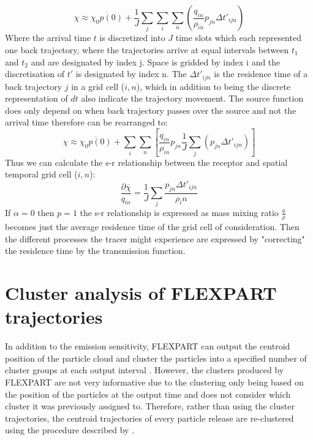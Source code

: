 \begin{equation}\label{eq:discrete_mix_ratio}
    \chi \approx \overline{\chi_0p(0)} + \frac{1}{J} \sum_j \sum_i \sum_n \left(\frac{q_{in}}{\rho_{in}}p_{jn}\Delta t'_{ijn}\right)
\end{equation}
Where the arrival time $t$ is discretized into $J$ time slots which each represented one back trajectory, where the trajectories arrive at equal intervals between $t_1$ and $t_2$ and are designated by index j. Space is gridded by index i and the discretisation of $t'$ is designated by index n. The $\Delta t'_{ijn}$ is the residence time of a back trajectory $j$ in a grid cell ($i,n$), which in addition to being the discrete representation of $dt$ also indicate the trajectory movement. The source function does only depend on when back trajectory passes over the source and not the arrival time therefore  can be rearranged to:
\begin{equation}
    \chi \approx \overline{\chi_0p(0)} + \sum_i \sum_n \left[\frac{q_{in}}{\rho_{in}}p_{jn} \frac{1}{J}\sum_j (p_{jn}\Delta t'_{ijn})\right]
\end{equation}
Thus we can calculate the s-r relationship between the receptor and spatial temporal grid cell ($i,n$):
\begin{equation}
    \frac{\partial \overline{\chi}}{q_{in}} = \frac{1}{J} \sum_j \frac{p_{jn} \Delta t'_{ijn}}{\rho_in}
\end{equation}
If $\alpha=0$ then $p=1$ the s-r relationship is expressed as mass mixing ratio $\frac{q}{\rho}$ becomes just the average residence time of the grid cell of consideration. Then the different processes the tracer might experience are expressed by "correcting" the residence time by the transmission function. 


\chapter{Cluster analysis of FLEXPART trajectories}\label{chap:trajec_analysis}

In addition to the emission sensitivity, FLEXPART can output the centroid position of the particle cloud and cluster the particles into a specified number of cluster groups at each output interval \parencite{stohl_replacement_2002}. However, the clusters produced by FLEXPART are not very informative due to the clustering only being based on the position of the particles at the output time and does not consider which cluster it was previously assigned to. Therefore, rather than using the cluster trajectories, the centroid trajectories of every particle release are re-clustered using the procedure described by \textcite{dorling1992cluster}. 

